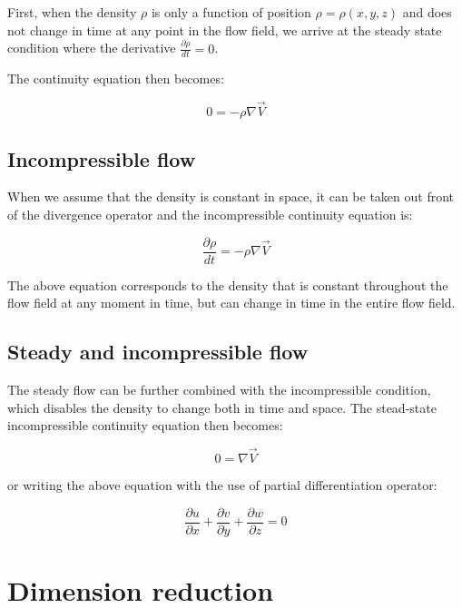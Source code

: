 First, when the density $\rho$ is only a function of position $\rho = \rho(x,y,z)$ and does not change in time at any point in the flow field, we arrive at the steady state condition where the derivative $\frac{\partial \rho}{dt} = 0$.

The continuity equation then becomes:

\begin{equation} \label{eq:continuity_stst}
0 = - \rho \nabla \vec{V}
\end{equation}

\subsection{Incompressible flow}

When we assume that the density is constant in space, it can be taken out front of the divergence operator and the incompressible continuity equation is:

\begin{equation} \label{eq:continuity_incompressible}
\frac{\partial \rho}{dt} = - \rho \nabla \vec{V}
\end{equation}

The above equation corresponds to the density that is constant throughout the flow field at any moment in time, but can change in time in the entire flow field.

\subsection{Steady and incompressible flow}

The steady flow can be further combined with the incompressible condition, which disables the density to change both in time and space. The stead-state incompressible continuity equation then becomes:

\begin{equation} \label{eq:continuity_stst_incompressible}
0 = \nabla \vec{V}
\end{equation}

or writing the above equation with the use of partial differentiation operator:

\begin{equation}
\frac{\partial u}{\partial x} + \frac{\partial v}{\partial y} + \frac{\partial w}{\partial z} = 0
\end{equation}

\section{Dimension reduction}
